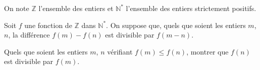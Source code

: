 On note $\mathbb{Z}$ l'ensemble des entiers et $\mathbb{N}^*$ l'ensemble des entiers strictement positifs.

Soit $f$ une fonction de $\mathbb{Z}$ dans $\mathbb{N}^*$. On suppose que, quels que soient les entiers $m$,
$n$, la différence $f(m) - f(n)$ est divisible par $f(m - n)$.

Quels que soient les entiers $m$, $n$ vérifiant $f(m) \leqslant f(n)$, montrer que $f(n)$ est divisible par
$f(m)$.
